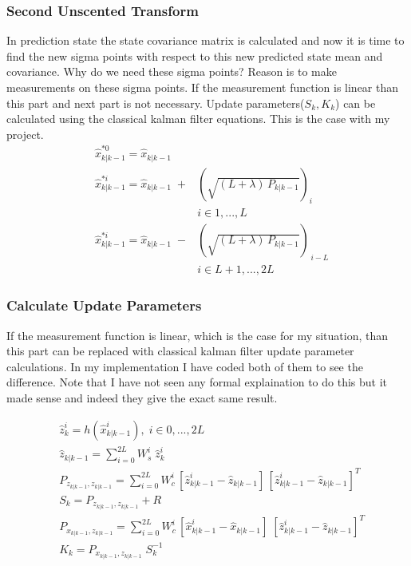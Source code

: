\documentclass[peerreview]{IEEEtran}
\begin{document}
\subsubsection{Second Unscented Transform}
In prediction state the state covariance matrix is calculated and now it is time to find the new sigma points with respect to this new predicted state mean and covariance. Why do we need these sigma points? Reason is to make measurements on these sigma points. If the measurement function is linear than this part and next part is not necessary. Update parameters($S_k, K_k$) can be calculated using the classical kalman filter equations. This is the case with my project.
\vspace{10px}
\begin{equation}
\begin{aligned}
&\hat{x}_{k|k-1}^{*0} = \hat{x}_{k|k-1} \\
&\hat{x}_{k|k-1}^{*i} = \hat{x}_{k|k-1} \; + &(\sqrt{(L+\lambda) \, P_{k|k-1}})_i  \\
& &i\in 1,...,L\\
&\hat{x}_{k|k-1}^{*i} = \hat{x}_{k|k-1} \; - &(\sqrt{(L+\lambda) \, P_{k|k-1}})_{\,i-L} \\
& &i\in L+1,...,2L 
\end{aligned}
\end{equation}
\vspace{10px}
\subsubsection{Calculate Update Parameters}
If the measurement function is linear, which is the case for my situation, than this part can be replaced with classical kalman filter update parameter calculations. In my implementation I have coded both of them to see the difference. Note that I have not seen any formal explaination to do this but it made sense and indeed they give the exact same result.
\vspace{10px}

\begin{equation}
\begin{aligned}
&\hat{z}_k^i = h(\hat{x}_{k|k-1}^i), \; i\in 0,...,2L\\
&\hat{z}_{k|k-1} = \sum\limits_{i=0}^{2L} W_s^i \; \hat{z}_k^i \\
&P_{z_{k|k-1}, z_{k|k-1}} = \sum\limits_{i=0}^{2L} W_c^i \, [\hat{z}_{k|k-1}^i - \hat{z}_{k|k-1}]\,[\hat{z}_{k|k-1}^i - \hat{z}_{k|k-1}]^T \\
&S_k = P_{z_{k|k-1}, z_{k|k-1}} + R\\
&P_{x_{k|k-1}, z_{k|k-1}} = \sum\limits_{i=0}^{2L} W_c^i \, [\hat{x}_{k|k-1}^i - \hat{x}_{k|k-1}]\;[\hat{z}_{k|k-1}^i - \hat{z}_{k|k-1}]^T\\
&K_k = P_{x_{k|k-1},z_{k|k-1}} \; S^{-1}_k
\end{aligned}
\end{equation}
\end{document}
